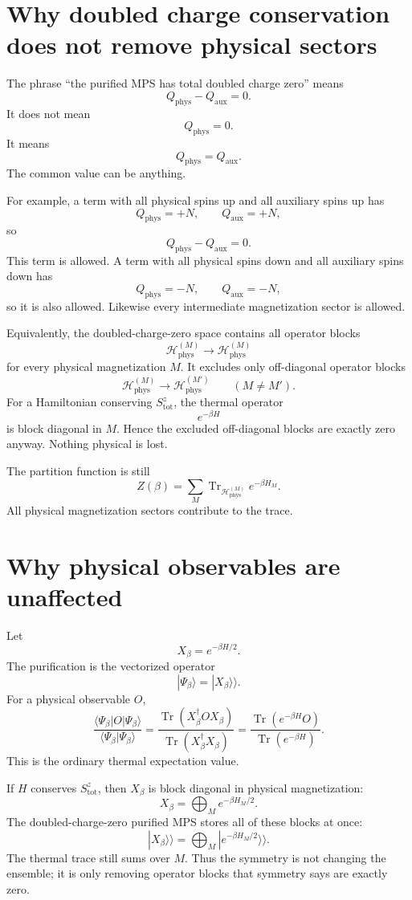 \documentclass[11pt]{article}
\newcommand{\Tr}{\operatorname{Tr}}
\newcommand{\Hphys}{\mathcal{H}_{\mathrm{phys}}}
\newcommand{\Q}{Q}
\begin{document}
\section{Why doubled charge conservation does not remove physical sectors}

The phrase ``the purified MPS has total doubled charge zero'' means
\[
\Q_{\mathrm{phys}}-\Q_{\mathrm{aux}}=0.
\]
It does not mean
\[
\Q_{\mathrm{phys}}=0.
\]
It means
\[
\Q_{\mathrm{phys}}=\Q_{\mathrm{aux}}.
\]
The common value can be anything.

For example, a term with all physical spins up and all auxiliary spins up has
\[
\Q_{\mathrm{phys}}=+N,\qquad \Q_{\mathrm{aux}}=+N,
\]
so
\[
\Q_{\mathrm{phys}}-\Q_{\mathrm{aux}}=0.
\]
This term is allowed. A term with all physical spins down and all auxiliary
spins down has
\[
\Q_{\mathrm{phys}}=-N,\qquad \Q_{\mathrm{aux}}=-N,
\]
so it is also allowed. Likewise every intermediate magnetization sector is
allowed.

Equivalently, the doubled-charge-zero space contains all operator blocks
\[
\Hphys^{(M)} \to \Hphys^{(M)}
\]
for every physical magnetization \(M\). It excludes only off-diagonal operator
blocks
\[
\Hphys^{(M)} \to \Hphys^{(M')}
\qquad (M\ne M').
\]
For a Hamiltonian conserving \(S^z_{\mathrm{tot}}\), the thermal operator
\[
e^{-\beta H}
\]
is block diagonal in \(M\). Hence the excluded off-diagonal blocks are exactly
zero anyway. Nothing physical is lost.

The partition function is still
\[
Z(\beta)
=
\sum_M \Tr_{\Hphys^{(M)}}e^{-\beta H_M}.
\]
All physical magnetization sectors contribute to the trace.

\section{Why physical observables are unaffected}

Let
\[
X_\beta=e^{-\beta H/2}.
\]
The purification is the vectorized operator
\[
|\Psi_\beta\rangle = |X_\beta\rangle\rangle.
\]
For a physical observable \(O\),
\[
\frac{\langle \Psi_\beta|O|\Psi_\beta\rangle}
     {\langle \Psi_\beta|\Psi_\beta\rangle}
=
\frac{\Tr(X_\beta^\dagger O X_\beta)}
     {\Tr(X_\beta^\dagger X_\beta)}
=
\frac{\Tr(e^{-\beta H}O)}
     {\Tr(e^{-\beta H})}.
\]
This is the ordinary thermal expectation value.

If \(H\) conserves \(S^z_{\mathrm{tot}}\), then \(X_\beta\) is block diagonal in
physical magnetization:
\[
X_\beta = \bigoplus_M e^{-\beta H_M/2}.
\]
The doubled-charge-zero purified MPS stores all of these blocks at once:
\[
|X_\beta\rangle\rangle
=
\bigoplus_M |e^{-\beta H_M/2}\rangle\rangle.
\]
The thermal trace still sums over \(M\). Thus the symmetry is not changing the
ensemble; it is only removing operator blocks that symmetry says are exactly
zero.
\end{document}
